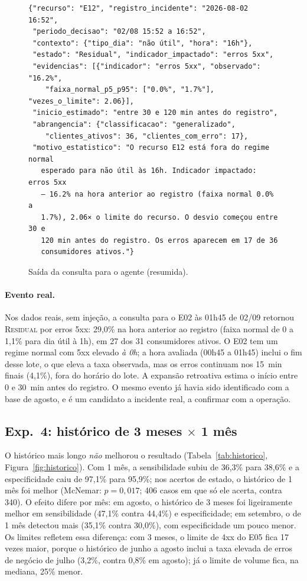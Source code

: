 \documentclass[sigconf,nonacm]{acmart}
\newcommand{\Residual}{\textsc{Residual}\xspace}
\begin{document}
\begin{figure}[t]
\begin{Verbatim}[fontsize=\scriptsize,frame=single]
{"recurso": "E12", "registro_incidente": "2026-08-02 16:52",
 "periodo_decisao": "02/08 15:52 a 16:52",
 "contexto": {"tipo_dia": "não útil", "hora": "16h"},
 "estado": "Residual", "indicador_impactado": "erros 5xx",
 "evidencias": [{"indicador": "erros 5xx", "observado": "16.2%",
    "faixa_normal_p5_p95": ["0.0%", "1.7%"], "vezes_o_limite": 2.06}],
 "inicio_estimado": "entre 30 e 120 min antes do registro",
 "abrangencia": {"classificacao": "generalizado",
    "clientes_ativos": 36, "clientes_com_erro": 17},
 "motivo_estatistico": "O recurso E12 está fora do regime normal
   esperado para não útil às 16h. Indicador impactado: erros 5xx
   — 16.2% na hora anterior ao registro (faixa normal 0.0% a
   1.7%), 2.06× o limite do recurso. O desvio começou entre 30 e
   120 min antes do registro. Os erros aparecem em 17 de 36
   consumidores ativos."}
\end{Verbatim}
\caption{Saída da consulta para o agente (resumida).}
\label{fig:json}
\end{figure}

\paragraph{Evento real.} Nos dados reais, sem injeção, a consulta para o E02 às 01h45 de 02/09 retornou \Residual por erros 5xx: 29,0\% na hora anterior ao registro (faixa normal de 0 a 1,1\% para dia útil à 1h), em 27 dos 31 consumidores ativos. O E02 tem um regime normal com 5xx elevado \emph{à 0h}; a hora avaliada (00h45 a 01h45) inclui o fim desse lote, o que eleva a taxa observada, mas os erros continuam nos 15~min finais (4,1\%), fora do horário do lote. A expansão retroativa estima o início entre 0 e 30~min antes do registro. O mesmo evento já havia sido identificado com a base de agosto, e é um candidato a incidente real, a confirmar com a operação.

\subsection{Exp.~4: histórico de 3 meses $\times$ 1 mês}
O histórico mais longo \emph{não} melhorou o resultado (Tabela~\ref{tab:historico}, Figura~\ref{fig:historico}). Com 1 mês, a sensibilidade subiu de 36,3\% para 38,6\% e a especificidade caiu de 97,1\% para 95,9\%; nos acertos de estado, o histórico de 1 mês foi melhor (McNemar: $p=0{,}017$; 406 casos em que só ele acerta, contra 340). O efeito difere por mês: em agosto, o histórico de 3 meses foi ligeiramente melhor em sensibilidade (47,1\% contra 44,4\%) e especificidade; em setembro, o de 1 mês detectou mais (35,1\% contra 30,0\%), com especificidade um pouco menor. Os limites refletem essa diferença: com 3 meses, o limite de 4xx do E05 fica 17 vezes maior, porque o histórico de junho a agosto inclui a taxa elevada de erros de negócio de julho (3,2\%, contra 0,8\% em agosto); já o limite de volume fica, na mediana, 25\% menor.
\end{document}
